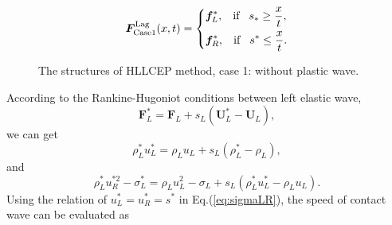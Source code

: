 \documentclass{article}
\numberwithin{equation}{section}
\numberwithin{table}{section}
\begin{document}
\begin{equation}
	\bm{F}^{\text{Lag}}_{\text{Case1}}(x,t) = \left\{ \begin{aligned}
		& \bm{f}_L^*, \hspace{0.3cm} \text{if} \hspace{0.3cm} s_*\ge \frac{x}{t},\\
		& \bm{f}_R^*, \hspace{0.3cm} \text{if} \hspace{0.3cm} s^*\le \frac{x}{t}.\\
	  \end{aligned}
	\right.
  \end{equation}

\begin{figure}
  \centering
\caption{The  structures of HLLCEP method, case 1: without plastic wave.}
\label{fig:case1}
\end{figure}
According to the Rankine-Hugoniot conditions between left elastic wave,
\begin{equation} \label{eq:RH1}
	\bm{F}_L^* = \bm{F}_L+s_L (\bm{U}_L^*-\bm{U}_L),
\end{equation}
we can  get 
\begin{equation} \label{eq:rhoLstar}
  \rho_L^* u_L^*=\rho_L u_L+s_L(\rho_L^*-\rho_L),
\end{equation}
and
\begin{equation}\label{eq:sigma}
  \rho_L^* u_R^{*2}-\sigma^*_L=\rho_L u_L^2-\sigma_L+s_L(\rho_L^* u_L^*-\rho_L u_L).
\end{equation}
Using the relation of $u_L^* =u_R^* = s^*$ in Eq.(\ref{eq:sigmaLR}), the speed of contact wave can be evaluated as 
\end{document}
